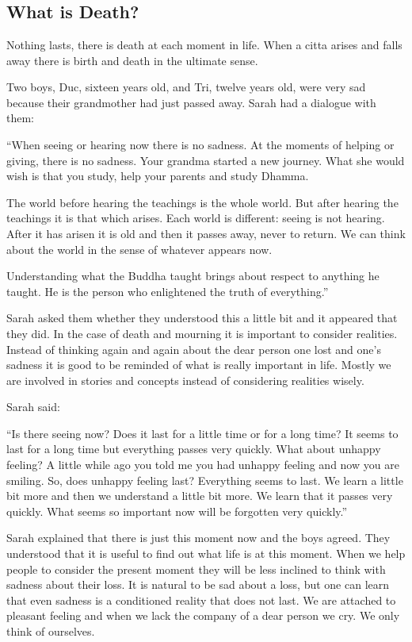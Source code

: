 \chapter[What is Death]{}
\section*{What is Death?}

Nothing lasts, there is death at each moment in life. When a citta
arises and falls away there is birth and death in the ultimate sense.

Two boys, Duc, sixteen years old, and Tri, twelve years old, were very
sad because their grandmother had just passed away. Sarah had a dialogue
with them:

``When seeing or hearing now there is no sadness. At the moments of
helping or giving, there is no sadness. Your grandma started a new
journey. What she would wish is that you study, help your parents and
study Dhamma.

The world before hearing the teachings is the whole world. But after
hearing the teachings it is that which arises. Each world is different:
seeing is not hearing. After it has arisen it is old and then it passes
away, never to return. We can think about the world in the sense of
whatever appears now.

Understanding what the Buddha taught brings about respect to anything he
taught. He is the person who enlightened the truth of everything.''

Sarah asked them whether they understood this a little bit and it
appeared that they did. In the case of death and mourning it is
important to consider realities. Instead of thinking again and again
about the dear person one lost and one's sadness it is good to be
reminded of what is really important in life. Mostly we are involved in
stories and concepts instead of considering realities wisely.

Sarah said:

``Is there seeing now? Does it last for a little time or for a long
time? It seems to last for a long time but everything passes very
quickly. What about unhappy feeling? A little while ago you told me you
had unhappy feeling and now you are smiling. So, does unhappy feeling
last? Everything seems to last. We learn a little bit more and then we
understand a little bit more. We learn that it passes very quickly. What
seems so important now will be forgotten very quickly.''

Sarah explained that there is just this moment now and the boys agreed.
They understood that it is useful to find out what life is at this
moment. When we help people to consider the present moment they will be
less inclined to think with sadness about their loss. It is natural to
be sad about a loss, but one can learn that even sadness is a
conditioned reality that does not last. We are attached to pleasant
feeling and when we lack the company of a dear person we cry. We only
think of ourselves.

